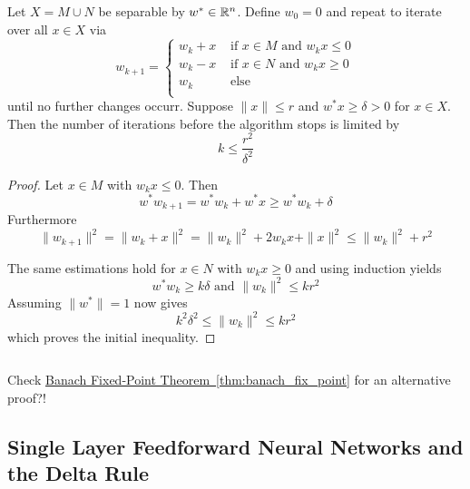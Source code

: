 \begin{theorem}\label{thm:perceptron_convergence}
    Let \( X = M \cup N \) be separable by \( w^*\in \mathbb{R}^n \). Define \( w_0 = 0 \)
    and repeat to iterate over all \( x \in X \) via
    \[
        w_{k + 1} = \left \{
        \begin{array}{ll}
            w_k + x & \text{ if } x \in M \text{ and } w_k x \le 0 \\
            w_k - x & \text{ if } x \in N \text{ and } w_k x \ge 0 \\
            w_k     & \text{ else }                                \\
        \end{array}
        \right.
    \]
    until no further changes occurr. Suppose \( \|x\| \le r \)  and \( w^*x \ge \delta > 0 \)
    for \( x \in X \). Then the number of iterations before the algorithm stops is limited by
    \[
        k\le \frac{r^2}{\delta^2}
    \]
\end{theorem}

\begin{proof}
    Let \( x \in M \) with \( w_k x \le 0 \). Then
    \[
        w^*w_{k + 1} = w^*w_k + w^*x \ge w^*w_k + \delta
    \]
    Furthermore
    \[
        \|w_{k + 1}\|^2 = \|w_k + x\|^2 = \|w_k\|^2 + 2w_k x + \|x\|^2 \le \|w_k\|^2 + r^2
    \]

    The same estimations hold for \( x \in N \) with \( w_k x \ge 0 \) and using induction yields
    \[
        w^*w_k \ge k\delta \text{ and } \|w_k\|^2 \le kr^2
    \]
    Assuming \( \|w^*\| = 1\) now gives
    \[
        k^2\delta^2 \le \|w_k\|^2 \le kr^2
    \]
    which proves the initial inequality.
\end{proof}
\bigskip


\begin{algorithm}[Perceptron]\label{algo:perceptron}
\end{algorithm}
\inputminted[fontsize=\small, framesep=0.35cm, frame=lines, python3=true]{python}{python/perceptron.py}
\bigskip


\begin{remark}
    Check \hyperref[thm:banach_fix_point]{Banach Fixed-Point Theorem~\ref*{thm:banach_fix_point}}
    for an alternative proof?!
\end{remark}
\bigskip


\subsection{Single Layer Feedforward Neural Networks and the Delta Rule}
\bigskip

